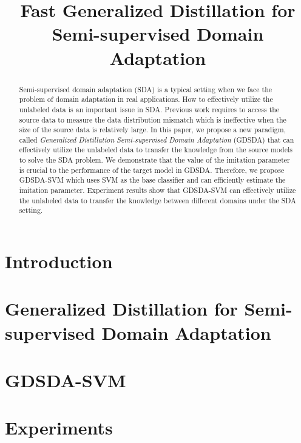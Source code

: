 \documentclass{llncs}
\begin{document}
\title{Fast Generalized Distillation for Semi-supervised Domain Adaptation}
\maketitle
\begin{abstract}
	Semi-supervised domain adaptation (SDA) is a typical setting when we face the problem of domain adaptation in real applications. How to effectively utilize the unlabeled data is an important issue in SDA.
	Previous work requires to access the source data to measure the data distribution mismatch which is ineffective when the size of the source data is relatively large.
	In this paper, we propose a new paradigm, called \textit{Generalized Distillation Semi-supervised Domain Adaptation} (GDSDA) that can effectively utilize the unlabeled data to transfer the knowledge from the source models to solve the SDA problem. We demonstrate that the value of the imitation parameter is crucial to the performance of the target model in GDSDA. Therefore, we propose GDSDA-SVM which uses SVM as the base classifier and can efficiently estimate the imitation parameter.  
	Experiment results show that GDSDA-SVM can effectively utilize the unlabeled data to transfer the knowledge between different domains under the SDA setting.
\end{abstract}

\section{Introduction}



%

\section{Generalized Distillation for Semi-supervised Domain Adaptation}\label{sec:gdda}



\section{GDSDA-SVM}\label{sec:svm}


\section{Experiments}\label{sec:exp}

\end{document}
